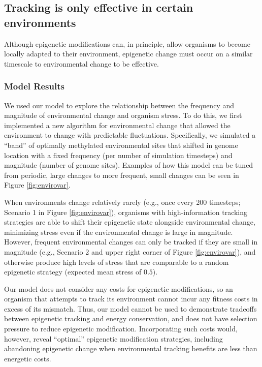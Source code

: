 \documentclass{article}
\begin{document}





\clearpage

\subsection{Tracking is only effective in certain environments}

Although epigenetic modifications can, in principle, allow organisms to become locally adapted to their environment, epigenetic change must occur on a similar timescale to environmental change to be effective.


\subsubsection{Model Results}

We used our model to explore the relationship between the frequency and magnitude of environmental change and organism stress. To do this, we first implemented a new algorithm for environmental change that allowed the environment to change with predictable fluctuations. Specifically, we simulated a ``band'' of optimally methylated environmental sites that shifted in genome location with a fixed frequency (per number of simulation timesteps) and magnitude (number of genome sites). Examples of how this model can be tuned from periodic, large changes to more frequent, small changes can be seen in Figure \ref{fig:envirovar}.

When environments change relatively rarely (e.g., once every 200 timesteps; Scenario 1 in Figure \ref{fig:envirovar}), organisms with high-information tracking strategies are able to shift their epigenetic state alongside environmental change, minimizing stress even if the environmental change is large in magnitude. However, frequent environmental changes can only be tracked if they are small in magnitude (e.g., Scenario 2 and upper right corner of Figure \ref{fig:envirovar}), and otherwise produce high levels of stress that are comparable to a random epigenetic strategy (expected mean stress of $0.5$).

Our model does not consider any costs for epigenetic modifications, so an organism that attempts to track its environment cannot incur any fitness costs in excess of its mismatch. Thus, our model cannot be used to demonstrate tradeoffs between epigenetic tracking and energy conservation, and does not have selection pressure to reduce epigenetic modification. Incorporating such costs would, however, reveal ``optimal'' epigenetic modification strategies, including abandoning epigenetic change when environmental tracking benefits are less than energetic costs.
\end{document}
